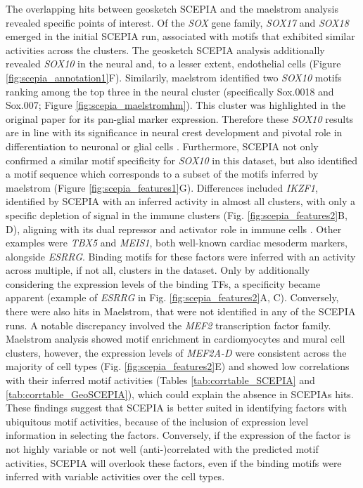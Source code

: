 The overlapping hits between geosketch SCEPIA and the maelstrom analysis revealed specific points of interest. Of the \textit{SOX} gene family, \textit{SOX17} and \textit{SOX18} emerged in the initial SCEPIA run, associated with motifs that exhibited similar activities across the clusters. The geosketch SCEPIA analysis additionally revealed \textit{SOX10} in the neural and, to a lesser extent, endothelial cells (Figure \ref{fig:scepia_annotation1}F). Similarily, maelstrom identified two \textit{SOX10} motifs ranking among the top three in the neural cluster (specifically Sox.0018 and Sox.007; Figure \ref{fig:scepia_maelstromhm}). This cluster was highlighted in the original paper for its pan-glial marker expression. Therefore these \textit{SOX10} results are in line with its significance in neural crest development and pivotal role in differentiation to neuronal or glial cells \cite{Lai2021}. Furthermore, SCEPIA not only confirmed a similar motif specificity for \textit{SOX10} in this dataset, but also identified a motif sequence which corresponds to a subset of the motifs inferred by maelstrom (Figure \ref{fig:scepia_features1}G). Differences included \textit{IKZF1}, identified by SCEPIA with an inferred activity in almost all clusters, with only a specific depletion of signal in the immune clusters (Fig. \ref{fig:scepia_features2}B, D), aligning with its dual repressor and activator role in immune cells \cite{Marke2018}. Other examples were \textit{TBX5} and \textit{MEIS1}, both well-known cardiac mesoderm markers, alongside \textit{ESRRG}. Binding motifs for these factors were inferred with an activity across multiple, if not all, clusters in the dataset. Only by additionally considering the expression levels of the binding TFs, a specificity became apparent (example of \textit{ESRRG} in Fig. \ref{fig:scepia_features2}A, C). Conversely, there were also hits in Maelstrom, that were not identified in any of the SCEPIA runs. A notable discrepancy involved the \textit{MEF2} transcription factor family. Maelstrom analysis showed motif enrichment in cardiomyocytes and mural cell clusters, however, the expression levels of \textit{MEF2A-D} were consistent across the majority of cell types (Fig. \ref{fig:scepia_features2}E) and showed low correlations with their inferred motif activities (Tables \ref{tab:corrtable_SCEPIA} and \ref{tab:corrtable_GeoSCEPIA}), which could explain the absence in SCEPIAs hits. These findings suggest that SCEPIA is better suited in identifying factors with ubiquitous motif activities, because of the inclusion of expression level information in selecting the factors. Conversely, if the expression of the factor is not highly variable or not well (anti-)correlated with the predicted motif activities, SCEPIA will overlook these factors, even if the binding motifs were inferred with variable activities over the cell types.



